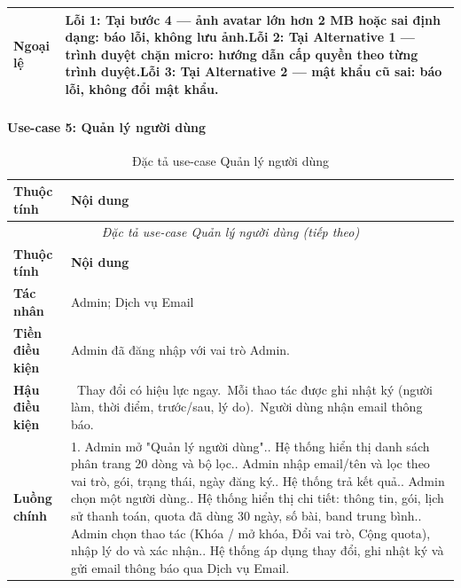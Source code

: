 \begin{longtable}{|p{3.2cm}|p{\dimexpr\linewidth-3.2cm-4\tabcolsep-3\arrayrulewidth\relax}|}
\textbf{Ngoại lệ} & \textbf{Lỗi 1:} Tại bước 4 --- ảnh avatar lớn hơn 2 MB hoặc sai định dạng: báo lỗi, không lưu ảnh.\newline \textbf{Lỗi 2:} Tại Alternative 1 --- trình duyệt chặn micro: hướng dẫn cấp quyền theo từng trình duyệt.\newline \textbf{Lỗi 3:} Tại Alternative 2 --- mật khẩu cũ sai: báo lỗi, không đổi mật khẩu. \\ \hline
\end{longtable}
\endgroup


\paragraph{Use-case 5: Quản lý người dùng}

\begingroup
\small
\renewcommand{\arraystretch}{1.15}
\begin{longtable}{|p{3.2cm}|p{\dimexpr\linewidth-3.2cm-4\tabcolsep-3\arrayrulewidth\relax}|}
\caption{Đặc tả use-case Quản lý người dùng}\label{wispace:tab:wispace_uc05_user_management}\\
\hline
\textbf{Thuộc tính} & \textbf{Nội dung} \\ \hline
\endfirsthead
\multicolumn{2}{c}{\textit{Đặc tả use-case Quản lý người dùng (tiếp theo)}}\\
\hline
\textbf{Thuộc tính} & \textbf{Nội dung} \\ \hline
\endhead
\hline
\endfoot
\textbf{Tác nhân} & Admin; Dịch vụ Email \\ \hline
\textbf{Tiền điều kiện} & Admin đã đăng nhập với vai trò Admin. \\ \hline
\textbf{Hậu điều kiện} & \textbullet{}\ Thay đổi có hiệu lực ngay.\newline \textbullet{}\ Mỗi thao tác được ghi nhật ký (người làm, thời điểm, trước/sau, lý do).\newline \textbullet{}\ Người dùng nhận email thông báo. \\ \hline
\textbf{Luồng chính} & 1. Admin mở "Quản lý người dùng".\newline 2. Hệ thống hiển thị danh sách phân trang 20 dòng và bộ lọc.\newline 3. Admin nhập email/tên và lọc theo vai trò, gói, trạng thái, ngày đăng ký.\newline 4. Hệ thống trả kết quả.\newline 5. Admin chọn một người dùng.\newline 6. Hệ thống hiển thị chi tiết: thông tin, gói, lịch sử thanh toán, quota đã dùng 30 ngày, số bài, band trung bình.\newline 7. Admin chọn thao tác (Khóa / mở khóa, Đổi vai trò, Cộng quota), nhập lý do và xác nhận.\newline 8. Hệ thống áp dụng thay đổi, ghi nhật ký và gửi email thông báo qua Dịch vụ Email. \\ \hline

\end{longtable}
